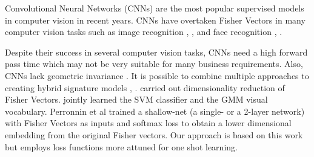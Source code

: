 \documentclass[10pt,twocolumn,letterpaper]{article}
\begin{document}
        Convolutional Neural Networks (CNNs) are the most popular supervised models in computer vision in recent years. CNNs have overtaken Fisher Vectors in many computer vision tasks such as image recognition \cite{krizhevsky2012imagenet}, \cite{szegedy2015going}, \cite{He2015} and face recognition \cite{SchroffEtAl15}, \cite{ParkhiEtAl15}.
        
        \begin{comment}
        (SM: We may want to have a broader review of unsupervised and supervised approaches, or refer to a survey. Otherwise it looks we are only talking about Fisher and CNNs.)
        \end{comment}
        
        Despite their success in several computer vision tasks, CNNs need a high forward pass time which may not be very suitable for many business requirements. Also, CNNs lack geometric invariance \cite{gong2014multi}. It is possible to combine multiple approaches to creating hybrid signature models \cite{simonyan2013deep}, \cite{sydorov2014deep} \cite{PerronninLarlusCVPR15}. \cite{simonyan2013deep} carried out dimensionality reduction of Fisher Vectors. \cite{sydorov2014deep} jointly learned the SVM classifier and the GMM visual vocabulary. Perronnin et al \cite{PerronninLarlusCVPR15} trained a shallow-net (a single- or a 2-layer network) with Fisher Vectors as inputs and softmax loss to obtain a lower dimensional embedding from the original Fisher vectors. Our approach is based on this work but employs loss functions more attuned for one shot learning. 
    
        \begin{comment}
        (SM: do we have other examples of hybrid approaches ?) ---> Yes, found in Perronnin's paper
        (SM: The lines below should go into the experimental results section
        
        since then, which provide substantial improvements in retrieval yield and accuracy (refer section \ref{sec:results}). 
        
        Moreover, we find that the softmax loss function in \cite{PerronninLarlusCVPR15} doesn't train well at all when run with our dataset, which has much fewer images (around 100,000) and more individual classes (of the order of 40,000) than ImageNet.
        \end{comment}
        
\end{document}
